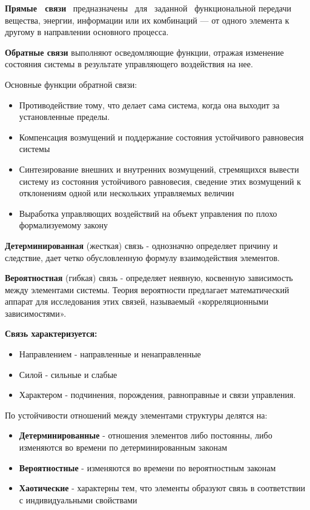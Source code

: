 \documentclass[a4paper]{article}
\begin{document}
	\textbf{Прямые  связи}  предназначены  для  заданной  функциональной передачи вещества, энергии, информации или их комбинаций — от одного элемента к другому в направлении основного процесса.
	
	\textbf{Обратные связи} выполняют осведомляющие функции, отражая изменение состояния системы в результате управляющего воздействия на нее. 
	
	Основные функции обратной связи:
	\begin{itemize}
		\item Противодействие тому, что делает сама система, когда она выходит за установленные пределы.
		\item Компенсация возмущений и поддержание состояния устойчивого равновесия системы
		\item Синтезирование внешних и внутренних возмущений, стремящихся вывести систему из состояния устойчивого равновесия, сведение этих возмущений к отклонениям одной или нескольких управляемых величин
		\item Выработка управляющих воздействий на объект управления по плохо формализуемому закону
	\end{itemize}

	\textbf{Детерминированная} (жесткая) связь - однозначно определяет причину и следствие, дает четко обусловленную формулу взаимодействия элементов.
	
	\textbf{Вероятностная} (гибкая) связь - определяет неявную, косвенную зависимость между элементами системы. Теория вероятности предлагает математический аппарат для исследования этих связей, называемый «корреляционными зависимостями».

	\textbf{Связь характеризуется: }
		\begin{itemize}
		\item Направлением - направленные и ненаправленные
		\item Силой - сильные и слабые
		\item Характером - подчинения, порождения, равноправные и связи управления.
	\end{itemize}

	По устойчивости отношений между элементами структуры делятся на:
		\begin{itemize}
		\item \textbf{Детерминированные} - отношения элементов либо постоянны, либо изменяются во времени по детерминированным законам
		\item \textbf{Вероятностные} - изменяются во времени по вероятностным законам
		\item \textbf{Хаотические} - характерны тем, что элементы образуют связь в соответствии с индивидуальными свойствами
	\end{itemize}
\end{document}
